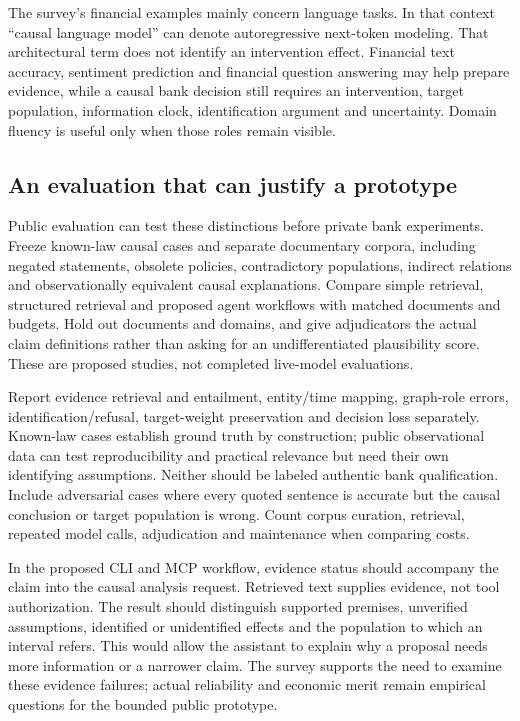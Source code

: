 The survey's financial examples mainly concern language tasks. In that context
``causal language model'' can denote autoregressive next-token modeling.
That architectural term does not identify an intervention effect. Financial
text accuracy, sentiment prediction and financial question answering may help
prepare evidence, while a causal bank decision still requires an intervention,
target population, information clock, identification argument and uncertainty.
Domain fluency is useful only when those roles remain visible.

\subsection{An evaluation that can justify a prototype}

Public evaluation can test these distinctions before private bank experiments.
Freeze known-law causal cases and separate documentary corpora, including
negated statements, obsolete policies, contradictory populations, indirect
relations and observationally equivalent causal explanations. Compare simple
retrieval, structured retrieval and proposed agent workflows with matched
documents and budgets. Hold out documents and domains, and give adjudicators
the actual claim definitions rather than asking for an undifferentiated
plausibility score. These are proposed studies, not completed live-model
evaluations.

Report evidence retrieval and entailment, entity/time mapping, graph-role
errors, identification/refusal, target-weight preservation and decision loss
separately. Known-law cases establish ground truth by construction; public
observational data can test reproducibility and practical relevance but need
their own identifying assumptions. Neither should be labeled authentic bank
qualification. Include adversarial cases where every quoted sentence is
accurate but the causal conclusion or target population is wrong. Count corpus
curation, retrieval, repeated model calls, adjudication and maintenance when
comparing costs.

In the proposed CLI and MCP workflow, evidence status should accompany the
claim into the causal analysis request. Retrieved text supplies evidence, not
tool authorization. The result should distinguish supported premises,
unverified assumptions, identified or unidentified effects and the population
to which an interval refers. This would allow the assistant to explain why a
proposal needs more information or a narrower claim. The survey supports the
need to examine these evidence failures; actual reliability and economic merit
remain empirical questions for the bounded public prototype.
